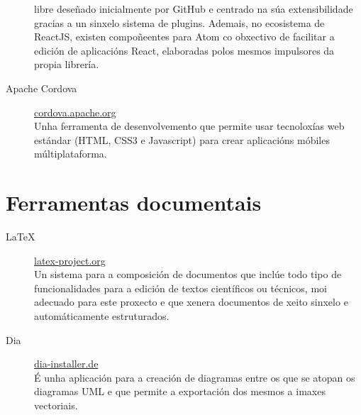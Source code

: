 \begin{description}
libre 
deseñado inicialmente por GitHub e centrado na súa extensibilidade gracias a un 
sinxelo sistema de plugins. Ademais, no ecosistema de ReactJS, existen 
compoñeentes para Atom co obxectivo de facilitar a edición de aplicacións React, 
elaboradas polos mesmos impulsores da propia librería.
   \item [Apache Cordova] 
\href{https://cordova.apache.org/}{cordova.apache.org}\\ Unha 
ferramenta de desenvolvemento que permite usar tecnoloxías web estándar (HTML, 
CSS3 e Javascript) para crear aplicacións móbiles múltiplataforma.

  \end{description}

  \section{Ferramentas documentais}

  \begin{description}
   \item [LaTeX] \href{https://www.latex-project.org/}{latex-project.org}\\ 
Un sistema para a 
composición de documentos que inclúe todo tipo de funcionalidades para a edición 
de textos científicos ou técnicos, moi adecuado para este proxecto e que xenera 
documentos de xeito sinxelo e automáticamente estruturados.
   \item [Dia] \href{http://dia-installer.de/}{dia-installer.de}\\ É unha 
aplicación para a 
creación de diagramas entre os que se atopan os diagramas UML e que permite a 
exportación dos mesmos a imaxes vectoriais.
  \end{description}
